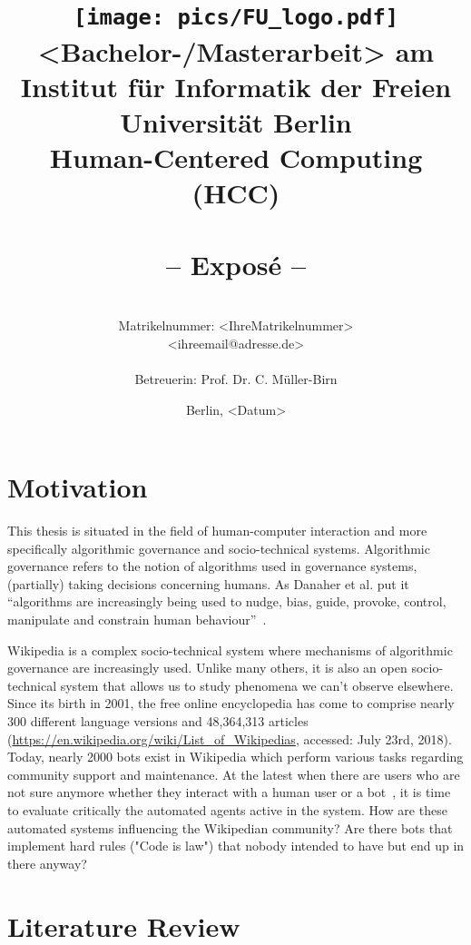 \documentclass[pdftex,a4paper,11pt]{scrartcl}
\title{\texttt{[image: pics/FU\_logo.pdf]}\\
{\small <Bachelor-/Masterarbeit> am Institut für Informatik der Freien Universität Berlin}\\
{\small Human-Centered Computing (HCC)}\\
[6ex]
{\LARGE<Titel der Arbeit>}\\
{\normalsize-- Exposé --}}
\author{
{\emph{\normalsize<Ihr Vor- und Nachname>}}\\
{\normalsize Matrikelnummer: <IhreMatrikelnummer>}\\
{\normalsize <ihreemail@adresse.de>}\\\\
{\normalsize Betreuerin: Prof. Dr. C. Müller-Birn}
}
\date{\normalsize Berlin, <Datum>}
\newcommand{\blankpage}{
\newpage
\thispagestyle{empty}
\mbox{}
\newpage
}
\begin{document}
\maketitle

\thispagestyle{empty}  %

\blankpage

\setcounter{page}{1} %

\section{Motivation}

This thesis is situated in the field of human-computer interaction and more specifically algorithmic governance and socio-technical systems.
Algorithmic governance refers to the notion of algorithms used in governance systems, (partially) taking decisions concerning humans.
As Danaher et al. put it ``algorithms are increasingly being used to nudge, bias, guide, provoke, control, manipulate and constrain human behaviour''~\cite{DanaherEtAl2017}.

Wikipedia is a complex socio-technical system where mechanisms of algorithmic governance are increasingly used.
Unlike many others, it is also an open socio-technical system that allows us to study phenomena we can't observe elsewhere.
Since its birth in 2001, the free online encyclopedia has come to comprise nearly 300 different language versions and 48,364,313 articles (\url{https://en.wikipedia.org/wiki/List_of_Wikipedias}, accessed: July 23rd, 2018).
Today, nearly 2000 bots exist in Wikipedia which perform various tasks regarding community support and maintenance.
At the latest when there are users who are not sure anymore whether they interact with a human user or a bot~\cite{FordGeiger2012}, it is time to evaluate critically the automated agents active in the system.
How are these automated systems influencing the Wikipedian community?
Are there bots that implement hard rules ("Code is law") that nobody intended to have but end up in there anyway?



\section{Literature Review}
\end{document}
